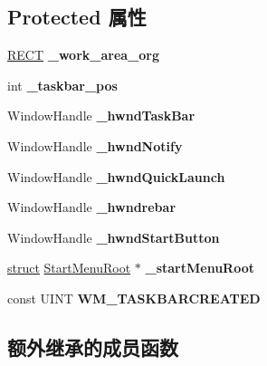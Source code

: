 \subsection*{Protected 属性}
\begin{DoxyCompactItemize}
\item 
\mbox{\label{struct_desktop_bar_ab0ddef577e7d0546b7b939bf76621f11}} 
\hyperlink{structtag_r_e_c_t}{R\+E\+CT} {\bfseries \+\_\+work\+\_\+area\+\_\+org}
\item 
\mbox{\label{struct_desktop_bar_ae41816979855cf3e314c62777c8d203c}} 
int {\bfseries \+\_\+taskbar\+\_\+pos}
\item 
\mbox{\label{struct_desktop_bar_a441f7ffabe13a7f4e9529ba26bad0fd3}} 
Window\+Handle {\bfseries \+\_\+hwnd\+Task\+Bar}
\item 
\mbox{\label{struct_desktop_bar_a25677ba10f212acf0a20f18d5a2c8c50}} 
Window\+Handle {\bfseries \+\_\+hwnd\+Notify}
\item 
\mbox{\label{struct_desktop_bar_a234d37197ac346e39e173956171efb72}} 
Window\+Handle {\bfseries \+\_\+hwnd\+Quick\+Launch}
\item 
\mbox{\label{struct_desktop_bar_a0f5b73eed4fbf5c655a1a41009da3447}} 
Window\+Handle {\bfseries \+\_\+hwndrebar}
\item 
\mbox{\label{struct_desktop_bar_a5b91f2d5e9f4f1881f3421dcfe972540}} 
Window\+Handle {\bfseries \+\_\+hwnd\+Start\+Button}
\item 
\mbox{\label{struct_desktop_bar_acfd137f61dd47bd241e05a735fd868f9}} 
\hyperlink{interfacestruct}{struct} \hyperlink{struct_start_menu_root}{Start\+Menu\+Root} $\ast$ {\bfseries \+\_\+start\+Menu\+Root}
\item 
\mbox{\label{struct_desktop_bar_a10920400cb863002e45acbdc6619d50d}} 
const U\+I\+NT {\bfseries W\+M\+\_\+\+T\+A\+S\+K\+B\+A\+R\+C\+R\+E\+A\+T\+ED}
\end{DoxyCompactItemize}
\subsection*{额外继承的成员函数}



